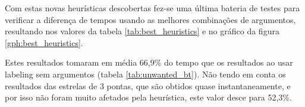 Com estas novas heurísticas descobertas fez-se uma última bateria de testes para verificar a diferença de tempos usando as melhores combinações de argumentos, resultando nos valores da tabela \ref{tab:best_heuristics} e no gráfico da figura \ref{gph:best_heuristics}.

Estes resultados tomaram em média 66,9\% do tempo que os resultados ao usar labeling sem argumentos (tabela \ref{tab:unwanted_bt}). Não tendo em conta os resultados das estrelas de 3 pontas, que são obtidos quase instantaneamente, e por isso não foram muito afetados pela heurística, este valor desce para 52,3\%.


